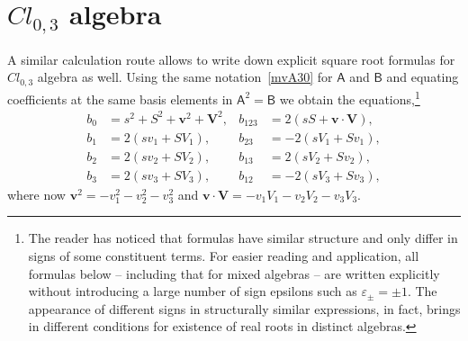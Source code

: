 \documentclass{birkjour}
\newcommand{\cl}[2]{\ensuremath{\mathit{Cl}_{#1,#2}}}
\def\A{\mathsf{A}}
\def\B{\mathsf{B}}
\newcommand{\bv}{\ensuremath{\mathbf{v}}}
\newcommand{\bV}{\ensuremath{\mathbf{V}}}
\begin{document}
\section{\cl{0}{3} algebra}\label{sec:Cl03}
A similar calculation route allows to write down explicit square
root formulas for \cl{0}{3} algebra as well. Using the same
notation~\eqref{mvA30} for $\A$ and $\B$ and equating coefficients
at the same basis elements in $\A^2=\B$ we obtain the
equations,\footnote{The reader has noticed that formulas
 have similar structure and only differ in signs of
some constituent terms. For easier reading and application, all
formulas below -- including that for mixed algebras -- are written
explicitly without introducing a large number of sign epsilons
such as $\varepsilon_{\pm}=\pm 1$. The appearance of different
signs in structurally similar expressions, in fact, brings in
different conditions for existence of real roots in distinct
algebras.}
\begin{align}
b_0&=s^2+S^2+\bv^2+\bV^2, &b_{123}&=2(sS+\bv\cdot\bV)\label{MVM10Cl03}, \\
b_1&=2(s v_1+S V_1), &b_{23}&=-2(s V_1+S v_1)\label{MVM20Cl03}, \\
b_2&=2(s v_2+S V_2), &b_{13}&=2(s V_2+S v_2)\label{MVM30Cl03}, \\
b_3&=2(s v_3+S V_3), &b_{12}&=-2(s V_3+S v_3)\label{MVM40Cl03},
\end{align}
where now $\bv^2=-v_1^2-v_2^2-v_3^2$ and $\bv\cdot\bV=-v_1 V_1- v_2 V_2- v_3 V_3$.
\end{document}
